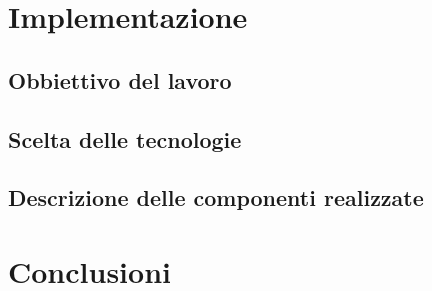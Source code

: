 \documentclass[12pt]{report}
\begin{document}
\chapter{Implementazione}
\section{Obbiettivo del lavoro}
\section{Scelta delle tecnologie}
\section{Descrizione delle componenti realizzate}
\chapter*{Conclusioni}
 
 
\end{document}
